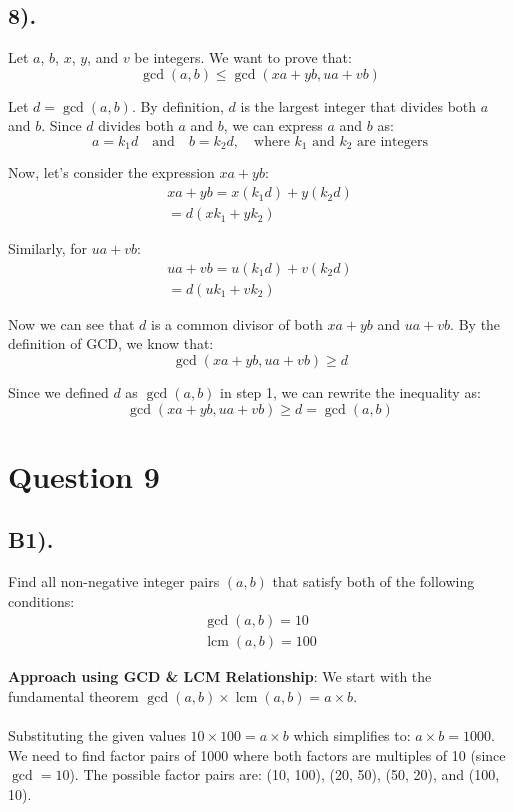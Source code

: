 \documentclass[12pt]{article}
\begin{document}
\subsection*{8).}
Let $a$, $b$, $x$, $y$, and $v$ be integers. We want to prove that:
\[
    \gcd(a,b) \leq \gcd(xa+yb, ua+vb)
\]

Let $d = \gcd(a,b)$. By definition, $d$ is the largest integer that divides both $a$ and $b$.
Since $d$ divides both $a$ and $b$, we can express $a$ and $b$ as:
\[
    a = k_1d \quad \text{and} \quad b = k_2d, \quad \text{where } k_1 \text{ and } k_2 \text{ are integers}
\]

Now, let's consider the expression $xa + yb$:
\begin{gather*}
    xa + yb = x(k_1d) + y(k_2d) \\
            = d(xk_1 + yk_2)
\end{gather*}

Similarly, for $ua + vb$:
\begin{gather*}
    ua + vb = u(k_1d) + v(k_2d) \\
            = d(uk_1 + vk_2)
\end{gather*}

Now we can see that $d$ is a common divisor of both $xa + yb$ and $ua + vb$.
By the definition of GCD, we know that:
\[
    \gcd(xa+yb, ua+vb) \geq d
\]

Since we defined $d$ as $\gcd(a,b)$ in step 1, we can rewrite the inequality as:
\[
    \gcd(xa+yb, ua+vb) \geq d = \gcd(a,b)
\]

\section*{Question 9}
\subsection*{B1).}

Find all non-negative integer pairs $(a, b)$ that satisfy both of the following conditions:
\begin{gather*}
    \gcd(a, b) = 10 \\
    \operatorname{lcm}(a, b) = 100
\end{gather*}

\textbf{Approach using GCD \& LCM Relationship}: We start with the fundamental theorem $\gcd(a, b) \times \operatorname{lcm}(a, b) = a \times b$. \\ \\
Substituting the given values $10 \times 100 = a \times b$ which simplifies to: $a \times b = 1000$.
We need to find factor pairs of 1000 where both factors are multiples of 10 (since $\gcd = 10$).
The possible factor pairs are: (10, 100), (20, 50), (50, 20), and (100, 10). \\
\end{document}
